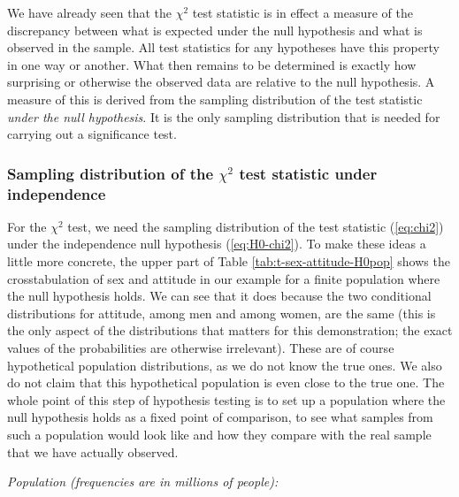 \documentclass[11pt,a4paper,openany]{book}
\begin{document}
We have already seen that the \(\chi^{2}\) test statistic is in effect a
measure of the discrepancy between what is expected under the null
hypothesis and what is observed in the sample. All test statistics for
any hypotheses have this property in one way or another. What then
remains to be determined is exactly how surprising or otherwise the
observed data are relative to the null hypothesis. A measure of this is
derived from the sampling distribution of the test statistic \emph{under
the null hypothesis}. It is the only sampling distribution that is
needed for carrying out a significance test.

\subsubsection*{\texorpdfstring{Sampling distribution of the
\(\chi^{2}\) test statistic under
independence}{Sampling distribution of the \textbackslash{}chi\^{}\{2\} test statistic under independence}}\label{sampling-distribution-of-the-chi2-test-statistic-under-independence}

For the \(\chi^{2}\) test, we need the sampling distribution of the test
statistic (\ref{eq:chi2}) under the independence null hypothesis
(\ref{eq:H0-chi2}). To make these ideas a little more concrete, the
upper part of Table \ref{tab:t-sex-attitude-H0pop} shows the
crosstabulation of sex and attitude in our example for a finite
population where the null hypothesis holds. We can see that it does
because the two conditional distributions for attitude, among men and
among women, are the same (this is the only aspect of the distributions
that matters for this demonstration; the exact values of the
probabilities are otherwise irrelevant). These are of course
hypothetical population distributions, as we do not know the true ones.
We also do not claim that this hypothetical population is even close to
the true one. The whole point of this step of hypothesis testing is to
set up a population where the null hypothesis holds as a fixed point of
comparison, to see what samples from such a population would look like
and how they compare with the real sample that we have actually
observed.

\emph{Population (frequencies are in millions of people):}
\end{document}
